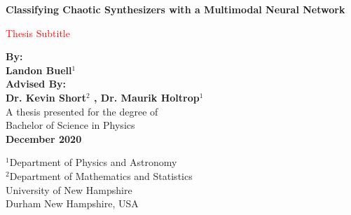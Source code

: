 \documentclass[12pt,letterpaper]{article}
\begin{document}

\begin{titlepage}
	\begin{center}
   		\vspace*{1cm}
       	\begin{LARGE}
       	\textbf{Classifying Chaotic Synthesizers with a Multimodal Neural Network} \\
       	\end{LARGE}
       	\vspace{1cm}
       	\begin{Large}
       	\textcolor{red}{Thesis Subtitle}
       	\end{Large}             
       	\vspace{1.5cm}

       	\textbf{By: \\ Landon Buell$^1$} \\       
       	\vspace{0.5cm}
       	\textbf{Advised By: \\ Dr. Kevin Short$^2$ , Dr. Maurik Holtrop$^1$} \\
      	\vspace{1cm}
      	A thesis presented for the degree of\\
       	Bachelor of Science in Physics \\
       	\vspace{0.5cm}
       	\textbf{December 2020}
        \vspace{1cm}

       	\vfill
      
       	\vspace{1cm}              
       	$^1$Department of Physics and Astronomy\\           
       	$^2$Department of Mathematics and Statistics\\
       	\vspace{0.5cm}  
       	University of New Hampshire\\
       	Durham New Hampshire, USA\\            
   \end{center}
\end{titlepage}

\tableofcontents

\end{document}
